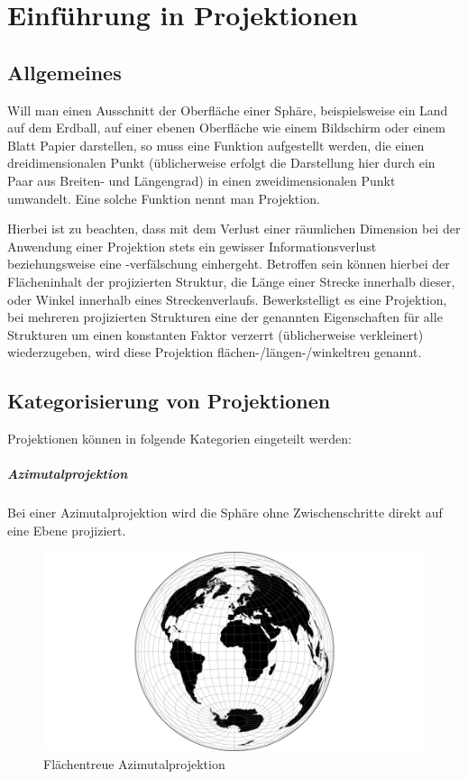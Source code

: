 \chapter{Einführung in Projektionen}
\label{ch:theory}

\section{Allgemeines}

Will man einen Ausschnitt der Oberfläche einer Sphäre, beispielsweise ein Land auf dem Erdball, auf einer ebenen Oberfläche wie einem Bildschirm oder einem Blatt Papier darstellen, so muss eine Funktion aufgestellt werden, die einen dreidimensionalen Punkt (üblicherweise erfolgt die Darstellung hier durch ein Paar aus Breiten- und Längengrad) in einen zweidimensionalen Punkt umwandelt. Eine solche Funktion nennt man Projektion.

Hierbei ist zu beachten, dass mit dem Verlust einer räumlichen Dimension bei der Anwendung einer Projektion stets ein gewisser Informationsverlust beziehungsweise eine -verfälschung einhergeht. Betroffen sein können hierbei der Flächeninhalt der projizierten Struktur, die Länge einer Strecke innerhalb dieser, oder Winkel innerhalb eines Streckenverlaufs. Bewerkstelligt es eine Projektion, bei mehreren projizierten Strukturen eine der genannten Eigenschaften für alle Strukturen um einen konstanten Faktor verzerrt (üblicherweise verkleinert) wiederzugeben, wird diese Projektion flächen-/längen-/winkeltreu genannt.

\section{Kategorisierung von Projektionen}

Projektionen können in folgende Kategorien eingeteilt werden:

\paragraph{Azimutalprojektion}

Bei einer Azimutalprojektion wird die Sphäre ohne Zwischenschritte direkt auf eine Ebene projiziert.

\begin{figure}[H]
    \centering
    
    \includegraphics[width=.5\textwidth]{images/azimuthalEqualArea}
    \caption{Flächentreue Azimutalprojektion}
\end{figure}

